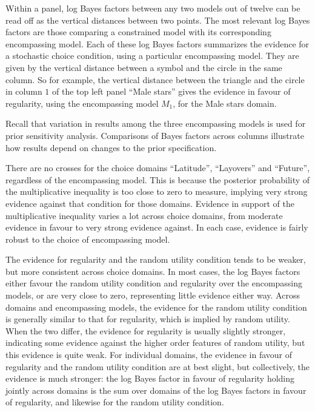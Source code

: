 \documentclass[11pt,letter]{article}
\begin{document}
Within a panel, log Bayes factors between any two models out of twelve can be read off as the vertical distances between two points.
The most relevant log Bayes factors are those comparing a constrained model with its corresponding encompassing model.
Each of these log Bayes factors summarizes the evidence for a stochastic choice condition, using a particular encompassing model.
They are given by the vertical distance between a symbol and the circle in the same column.
So for example, the vertical distance between the triangle and the circle in column $1$ of the top left panel ``Male stars'' gives the evidence in favour of regularity, using the encompassing model $M_1$, for the Male stars domain.

Recall that variation in results among the three encompassing models is used for prior sensitivity analysis.
Comparisons of Bayes factors across columns illustrate how results depend on changes to the prior specification.

There are no crosses for the choice domains ``Latitude'', ``Layovers'' and ``Future'', regardless of the encompassing model.
This is because the posterior probability of the multiplicative inequality is too close to zero to measure, implying very strong evidence against that condition for those domains.
Evidence in support of the multiplicative inequality varies a lot across choice domains, from moderate evidence in favour to very strong evidence against.
In each case, evidence is fairly robust to the choice of encompassing model.

The evidence for regularity and the random utility condition tends to be weaker, but more consistent across choice domains.
In most cases, the log Bayes factors either favour the random utility condition and regularity over the encompassing models, or are very close to zero, representing little evidence either way.
Across domains and encompassing models, the evidence for the random utility condition is generally similar to that for regularity, which is implied by random utility.
When the two differ, the evidence for regularity is usually slightly stronger, indicating some evidence against the higher order features of random utility, but this evidence is quite weak.
For individual domains, the evidence in favour of regularity and the random utility condition are at best slight, but collectively, the evidence is much stronger: the log Bayes factor in favour of regularity holding jointly across domains is the sum over domains of the log Bayes factors in favour of regularity, and likewise for the random utility condition.
\end{document}
